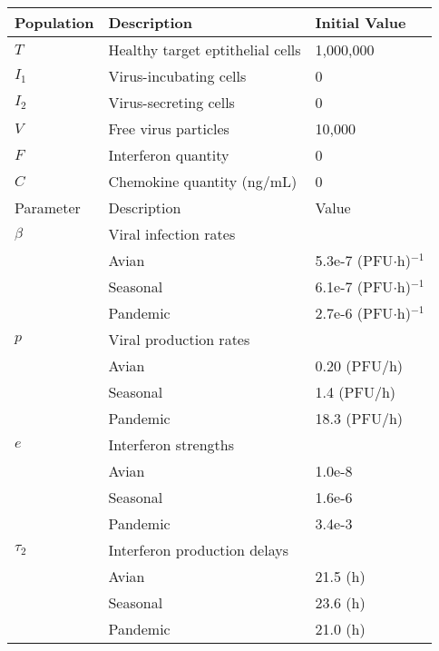 \documentclass[10pt]{article}
\begin{document}
\begin{table}
\begin{center}
\begin{tabular}{|  l  l  l  |}
  \hline
  Population & Description & Initial Value\\
  \hline
  $T$ & Healthy target eptithelial cells & 1,000,000 \\
  $I_1$ & Virus-incubating cells & 0 \\
  $I_2$ & Virus-secreting cells & 0 \\
  $V$ & Free virus particles & 10,000 \\
  $F$ & Interferon quantity & 0 \\
  $C$ & Chemokine quantity (ng/mL) & 0 \\
  \hline
  Parameter & Description & Value \\
  \hline
  $\beta$ & Viral infection rates &  \\
    & \hspace{2em} Avian & 5.3e-7 (PFU$\cdot$h)$^{-1}$ \\
    & \hspace{2em} Seasonal & 6.1e-7 (PFU$\cdot$h)$^{-1}$ \\
    & \hspace{2em} Pandemic &  2.7e-6 (PFU$\cdot$h)$^{-1}$\\
  $p$ & Viral production rates & \\
    & \hspace{2em} Avian & 0.20 (PFU/h) \\
    & \hspace{2em} Seasonal & 1.4 (PFU/h) \\
    & \hspace{2em} Pandemic & 18.3 (PFU/h) \\
  $e$ & Interferon strengths & \\
    & \hspace{2em} Avian & 1.0e-8 \\
    & \hspace{2em} Seasonal & 1.6e-6 \\
    & \hspace{2em} Pandemic & 3.4e-3 \\
  $\tau_2$ & Interferon production delays &  \\
    & \hspace{2em} Avian & 21.5 (h) \\
    & \hspace{2em} Seasonal & 23.6 (h) \\
    & \hspace{2em} Pandemic & 21.0 (h) \\

\end{tabular}
\end{center}
\end{table}
\end{document}
